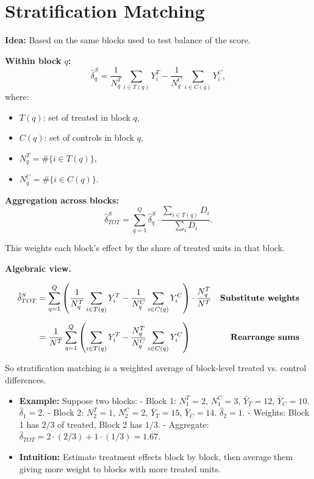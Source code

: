 \documentclass[12pt]{article}
\begin{document}
\section*{\noindent\textbf{Stratification Matching}}

\textbf{Idea:}  
Based on the same blocks used to test balance of the score.

\textbf{Within block $q$:}
\[
\hat{\delta}_q^S 
   = \frac{1}{N_q^T} \sum_{i \in T(q)} Y_i^T 
     - \frac{1}{N_q^C} \sum_{i \in C(q)} Y_i^C,
\]
where:
\begin{itemize}
    \item $T(q)$: set of treated in block $q$,
    \item $C(q)$: set of controls in block $q$,
    \item $N_q^T = \#\{i \in T(q)\}$,
    \item $N_q^C = \#\{i \in C(q)\}$.
\end{itemize}

\textbf{Aggregation across blocks:}
\[
\hat{\delta}_{TOT}^S 
   = \sum_{q=1}^Q \hat{\delta}_q^S 
      \cdot \frac{\sum_{i \in T(q)} D_i}{\sum_i D_i}.
\]

This weights each block’s effect by the share of treated units in that block.

\textbf{Algebraic view.}

\singlespacing
\begin{align}
\hat{\delta}_{TOT}^S 
   &= \sum_{q=1}^Q 
      \left( \frac{1}{N_q^T}\sum_{i \in T(q)} Y_i^T 
           - \frac{1}{N_q^C}\sum_{i \in C(q)} Y_i^C \right)
      \cdot \frac{N_q^T}{N^T} 
   & \text{\textbf{Substitute weights}} \\[6pt]
   &= \frac{1}{N^T}\sum_{q=1}^Q 
       \left( \sum_{i \in T(q)} Y_i^T 
           - \frac{N_q^T}{N_q^C}\sum_{i \in C(q)} Y_i^C \right)
   & \text{\textbf{Rearrange sums}}
\end{align}

So stratification matching is a weighted average of block-level treated vs. control differences.

\begin{itemize}
    \item \textbf{Example:} Suppose two blocks:  
      - Block 1: $N^T_1=2$, $N^C_1=3$, $\bar{Y}_T=12$, $\bar{Y}_C=10$.  
        $\hat{\delta}_1=2$.  
      - Block 2: $N^T_2=1$, $N^C_2=2$, $\bar{Y}_T=15$, $\bar{Y}_C=14$.  
        $\hat{\delta}_2=1$.  
      - Weights: Block 1 has $2/3$ of treated, Block 2 has $1/3$.  
      - Aggregate: $\hat{\delta}_{TOT}=2\cdot(2/3)+1\cdot(1/3)=1.67$.  
    \item \textbf{Intuition:} Estimate treatment effects block by block, then average them giving more weight to blocks with more treated units.  
\end{itemize}
\end{document}
